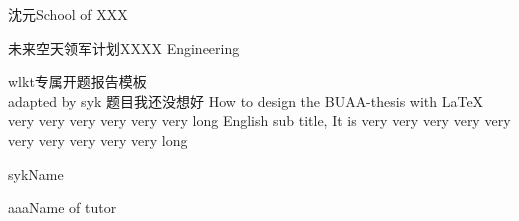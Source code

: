 
\school
{沈元}{School of XXX}

\major
{未来空天领军计划}{XXXX Engineering}

\thesistitle
{wlkt专属开题报告模板\\adapted by syk}
{题目我还没想好}
{How to design the BUAA-thesis with \LaTeX{} very very very very very very long}
{English sub title, It is very very very very very very very very very very long}

\thesisauthor
{syk}{Name}

\teacher
{aaa}{Name of tutor}






